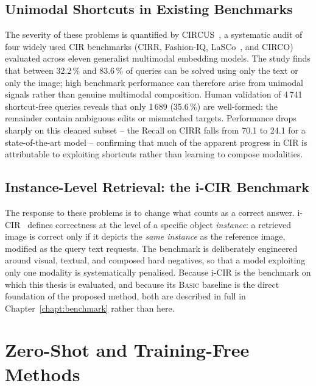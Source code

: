 \subsection{Unimodal Shortcuts in Existing Benchmarks}\label{sect:rel_circus}

The severity of these problems is quantified by CIRCUS~\cite{attimonelli2026circus},
a systematic audit of four widely used CIR benchmarks (CIRR, Fashion-IQ,
LaSCo~\cite{levy2024lasco}, and CIRCO) evaluated across eleven generalist
multimodal embedding models. The
study finds that between 32.2\,\% and 83.6\,\% of queries can be solved using
only the text or only the image; high benchmark performance can therefore arise
from unimodal signals rather than genuine multimodal composition.
Human validation of 4\,741 shortcut-free queries reveals that only 1\,689
(35.6\,\%) are well-formed: the remainder contain ambiguous edits or mismatched
targets. Performance drops sharply on this cleaned subset -- the Recall on CIRR
falls from 70.1 to 24.1 for a state-of-the-art model -- confirming that much of
the apparent progress in CIR is attributable to exploiting shortcuts rather than
learning to compose modalities.

\subsection{Instance-Level Retrieval: the i-CIR Benchmark}\label{sect:rel_icir}

The response to these problems is to change what counts as a correct answer.
i-CIR~\cite{psomas2025icir} defines correctness at the level of a specific object
\emph{instance}: a retrieved image is correct only if it depicts the \emph{same
instance} as the reference image, modified as the query text requests. The
benchmark is deliberately engineered around visual, textual, and composed hard
negatives, so that a model exploiting only one modality is systematically
penalised. Because i-CIR is the benchmark on which this thesis is evaluated, and
because its \textsc{Basic} baseline is the direct foundation of the proposed
method, both are described in full in Chapter~\ref{chapt:benchmark} rather than
here.

\section{Zero-Shot and Training-Free Methods}\label{sect:rel_zeroshot}

